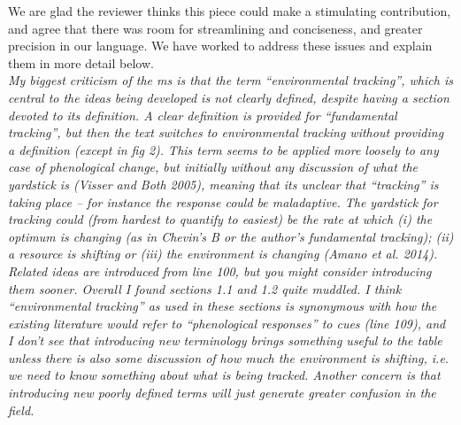 \documentclass[11pt]{article}
\begin{document}
We are glad the reviewer thinks this piece could make a stimulating contribution, and agree that there was room for streamlining and conciseness, and greater precision in our language. We have worked to address these issues and explain them in more detail below.\\

\emph{My biggest criticism of the ms is that the term “environmental tracking”, which is central to
the ideas being developed is not clearly defined, despite having a section devoted to its
definition. A clear definition is provided for “fundamental tracking”, but then the text
switches to environmental tracking without providing a definition (except in fig 2). This
term seems to be applied more loosely to any case of phenological change, but initially
without any discussion of what the yardstick is (Visser and Both 2005), meaning that its
unclear that “tracking” is taking place – for instance the response could be maladaptive. The
yardstick for tracking could (from hardest to quantify to easiest) be the rate at which (i)
the optimum is changing (as in Chevin’s B or the author’s fundamental tracking); (ii) a
resource is shifting or (iii) the environment is changing (Amano et al. 2014). Related ideas
are introduced from line 100, but you might consider introducing them sooner. Overall I found
sections 1.1 and 1.2 quite muddled. I think “environmental tracking” as used in these
sections is synonymous with how the existing literature would refer to “phenological
responses” to cues (line 109), and I don't see that introducing new terminology brings
something useful to the table unless there is also some discussion of how much the
environment is shifting, i.e. we need to know something about what is being tracked.  Another
concern is that introducing new poorly defined terms will just generate greater confusion in
the field.}\\
\end{document}
